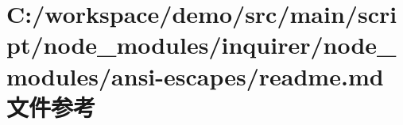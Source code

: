 \hypertarget{node__modules_2inquirer_2node__modules_2ansi-escapes_2_r_e_a_d_m_e_8md}{}\section{C\+:/workspace/demo/src/main/script/node\+\_\+modules/inquirer/node\+\_\+modules/ansi-\/escapes/readme.md 文件参考}
\label{node__modules_2inquirer_2node__modules_2ansi-escapes_2_r_e_a_d_m_e_8md}
